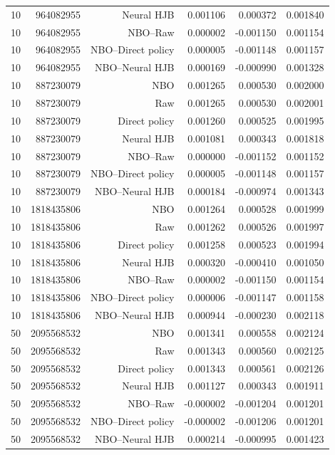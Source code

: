 \begin{longtable}{lrrrrr}
10 & 964082955 & Neural HJB & 0.001106 & 0.000372 & 0.001840 \\
10 & 964082955 & NBO--Raw & 0.000002 & -0.001150 & 0.001154 \\
10 & 964082955 & NBO--Direct policy & 0.000005 & -0.001148 & 0.001157 \\
10 & 964082955 & NBO--Neural HJB & 0.000169 & -0.000990 & 0.001328 \\
10 & 887230079 & NBO & 0.001265 & 0.000530 & 0.002000 \\
10 & 887230079 & Raw & 0.001265 & 0.000530 & 0.002001 \\
10 & 887230079 & Direct policy & 0.001260 & 0.000525 & 0.001995 \\
10 & 887230079 & Neural HJB & 0.001081 & 0.000343 & 0.001818 \\
10 & 887230079 & NBO--Raw & 0.000000 & -0.001152 & 0.001152 \\
10 & 887230079 & NBO--Direct policy & 0.000005 & -0.001148 & 0.001157 \\
10 & 887230079 & NBO--Neural HJB & 0.000184 & -0.000974 & 0.001343 \\
10 & 1818435806 & NBO & 0.001264 & 0.000528 & 0.001999 \\
10 & 1818435806 & Raw & 0.001262 & 0.000526 & 0.001997 \\
10 & 1818435806 & Direct policy & 0.001258 & 0.000523 & 0.001994 \\
10 & 1818435806 & Neural HJB & 0.000320 & -0.000410 & 0.001050 \\
10 & 1818435806 & NBO--Raw & 0.000002 & -0.001150 & 0.001154 \\
10 & 1818435806 & NBO--Direct policy & 0.000006 & -0.001147 & 0.001158 \\
10 & 1818435806 & NBO--Neural HJB & 0.000944 & -0.000230 & 0.002118 \\
50 & 2095568532 & NBO & 0.001341 & 0.000558 & 0.002124 \\
50 & 2095568532 & Raw & 0.001343 & 0.000560 & 0.002125 \\
50 & 2095568532 & Direct policy & 0.001343 & 0.000561 & 0.002126 \\
50 & 2095568532 & Neural HJB & 0.001127 & 0.000343 & 0.001911 \\
50 & 2095568532 & NBO--Raw & -0.000002 & -0.001204 & 0.001201 \\
50 & 2095568532 & NBO--Direct policy & -0.000002 & -0.001206 & 0.001201 \\
50 & 2095568532 & NBO--Neural HJB & 0.000214 & -0.000995 & 0.001423 \\

\end{longtable}
